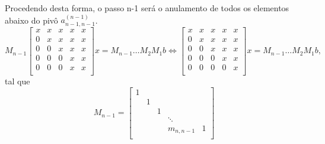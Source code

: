 \documentclass[../numerical_methods.tex]{subfiles}
\begin{document}
Procedendo desta forma, o passo n-1 será o anulamento de todos os elementos abaixo do pivô \(a_{n-1, n-1}^{(n-1)}\).
\[
	M_{n-1}\begin{bmatrix}
		x & x & x & x & x \\
		0 & x & x & x & x \\
		0 & 0 & x & x & x \\
		0 & 0 & 0 & x & x \\
		0 & 0 & 0 & x & x \\
	\end{bmatrix}x = M_{n-1}\dotsc M_{2}M_{1}b \Leftrightarrow \begin{bmatrix}
		x & x & x & x & x \\
		0 & x & x & x & x \\
		0 & 0 & x & x & x \\
		0 & 0 & 0 & x & x \\
		0 & 0 & 0 & 0 & x \\
	\end{bmatrix}x =M_{n-1}\dotsc  M_{2}M_{1}b,
\]
tal que
\[
	M_{n-1} = \begin{bmatrix}
		1 &   &   &            &   \\
		  & 1 &   &            &   \\
		  &   & 1 &            &   \\
		  &   &   & \ddots     &   \\
		  &   &   & m_{n, n-1} & 1 \\
	\end{bmatrix}
\]
\end{document}
